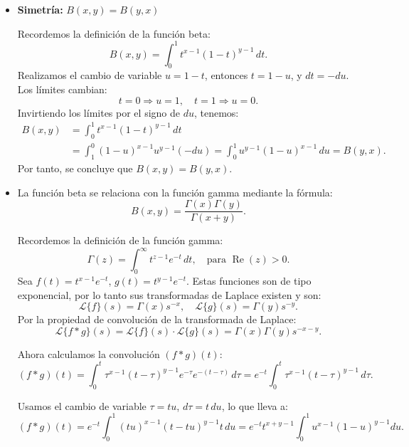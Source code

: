 \begin{itemize}
	\item \textbf{Simetría:} \( B(x, y) = B(y, x) \)
	      \begin{myproof}
		      Recordemos la definición de la función beta:
		      \[
			      B(x, y) = \int_0^1 t^{x-1}(1 - t)^{y - 1} \, dt.
		      \]
		      Realizamos el cambio de variable \( u = 1 - t \), entonces \( t = 1 - u \), y \( dt = -du \). Los límites cambian:
		      \[
			      t = 0 \Rightarrow u = 1, \quad t = 1 \Rightarrow u = 0.
		      \]
		      Invirtiendo los límites por el signo de \( du \), tenemos:
		      \begin{align*}
			      B(x, y) & = \int_0^1 t^{x-1}(1 - t)^{y - 1} \, dt                                                 \\
			              & = \int_1^0 (1 - u)^{x-1} u^{y-1} (-du) = \int_0^1 u^{y-1}(1 - u)^{x-1} \, du = B(y, x).
		      \end{align*}
		      Por tanto, se concluye que \( B(x, y) = B(y, x) \).
	      \end{myproof}


	\item
	      La función beta se relaciona con la función gamma mediante la fórmula:
	      \[
		      B(x, y) = \frac{\Gamma(x)\Gamma(y)}{\Gamma(x + y)}.
	      \]


	      \begin{myproof}
		      Recordemos la definición de la función gamma:
		      \[
			      \Gamma(z) = \int_0^\infty t^{z-1} e^{-t} \, dt, \quad \text{para } \operatorname{Re}(z) > 0.
		      \]
		      Sea \( f(t) = t^{x-1} e^{-t} \), \( g(t) = t^{y-1} e^{-t} \). Estas funciones son de tipo exponencial, por lo tanto sus transformadas de Laplace existen y son:
		      \[
			      \mathcal{L}\{f\}(s) = \Gamma(x)s^{-x}, \quad \mathcal{L}\{g\}(s) = \Gamma(y)s^{-y}.
		      \]
		      Por la propiedad de convolución de la transformada de Laplace:
		      \[
			      \mathcal{L}\{f * g\}(s) = \mathcal{L}\{f\}(s) \cdot \mathcal{L}\{g\}(s) = \Gamma(x)\Gamma(y)s^{-x-y}.
		      \]

		      Ahora calculamos la convolución \( (f * g)(t) \):
		      \[
			      (f * g)(t) = \int_0^t \tau^{x-1} (t - \tau)^{y-1} e^{-\tau} e^{-(t - \tau)} \, d\tau = e^{-t} \int_0^t \tau^{x-1} (t - \tau)^{y-1} \, d\tau.
		      \]

		      Usamos el cambio de variable \( \tau = tu \), \( d\tau = t\,du \), lo que lleva a:
		      \[
			      (f * g)(t) = e^{-t} \int_0^1 (tu)^{x-1} (t - tu)^{y-1} t\,du = e^{-t} t^{x + y - 1} \int_0^1 u^{x-1}(1 - u)^{y-1} du.
		      \]


\end{myproof}
\end{itemize}
